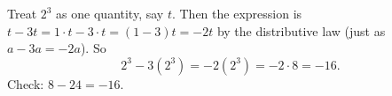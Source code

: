 Treat $2^3$ as one quantity, say $t$. Then the expression is $t-3t=1\cdot t-3\cdot t=(1-3)t=-2t$ by the distributive law (just as $a-3a=-2a$). So
\[
2^3-3\left(2^3\right)=-2\left(2^3\right)=-2\cdot8=\boxed{-16}.
\]
Check: $8-24=-16$.
